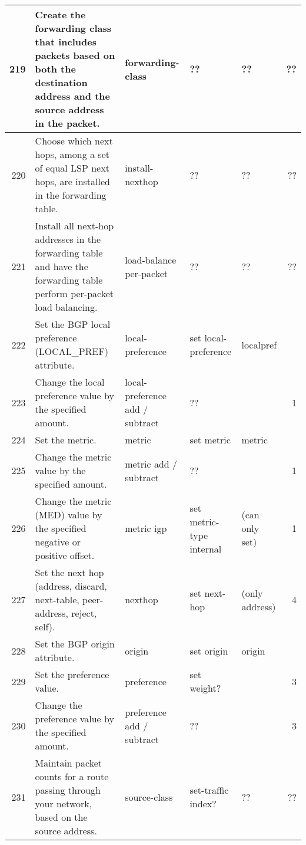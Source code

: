 \documentclass[letterpaper]{article}
\begin{document}
\begin{center}
\begin{supertabular}{|r |p{6cm} |p{2cm} |p{2cm} |p{2cm} |r|}
219 &
Create the forwarding class that includes packets based on both the destination
address and the source address in the packet. 
& forwarding-class & ?? & ?? & ?? \\
\hline

220 & 
Choose which next hops, among a set of equal LSP next hops, are installed in the
forwarding table. 
& install-nexthop & ?? & ?? & ?? \\
\hline

221 &
Install all next-hop addresses in the forwarding table and have the forwarding
table perform per-packet load balancing.
& load-balance per-packet & ?? & ?? & ?? \\
\hline

222 &
Set the BGP local preference (LOCAL\_PREF) attribute. 
& local-preference & set local-preference & localpref &\\
\hline

223 &
Change the local preference value by the specified amount. 
& local-preference add / subtract & ?? &  & 1 \\
\hline

224 &
Set the metric.
& metric & set metric & metric &\\
\hline

225 &
Change the metric value by the specified amount. 
& metric add / subtract & ?? &  & 1 \\
\hline

226 &
Change the metric (MED) value by the specified negative or positive offset.
& metric igp & set metric-type internal &  (can only set) & 1 \\
\hline

227 &
Set the next hop (address, discard, next-table, peer-address, reject, self).
& nexthop & set next-hop &  (only address) & 4 \\
\hline

228 &
Set the BGP origin attribute.
& origin & set origin & origin &\\
\hline

229 &
Set the preference value. 
& preference & set weight? &  & 3 \\
\hline

230 &
Change the preference value by the specified amount. 
& preference add / subtract & ?? &  & 3 \\
\hline

231 &
Maintain packet counts for a route passing through your network, based on the
source address.
& source-class & set-traffic index? & ?? & ?? \\
\hline


\end{supertabular}
\end{center}
\end{document}
